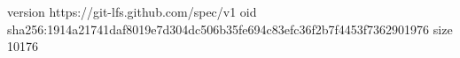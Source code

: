 version https://git-lfs.github.com/spec/v1
oid sha256:1914a21741daf8019e7d304dc506b35fe694c83efc36f2b7f4453f7362901976
size 10176
